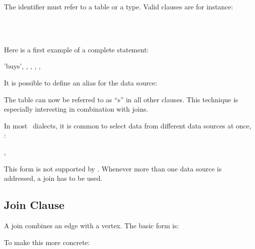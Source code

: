  

The identifier must refer to a table or a type.
Valid  clauses are for instance:

  \\
  \\
 

Here is a first example of a complete  statement:

 'buys', ,
                         , 
                         , 
                         ,
 

It is possible to define an alias for the data source:

   

The table  can now be referred to as ``s''
in all other clauses.
This technique is especially interesting in combination
with joins.

In most \sql\ dialects,
it is common to select data from different
data sources at once, \eg:

 , 

This form is not supported by \nowdb.
Whenever more than one data source is addressed,
a join has to be used.

\subsection{Join Clause}
A join combines an edge with a vertex.
The basic form is:

   

To make this more concrete:

  
   

